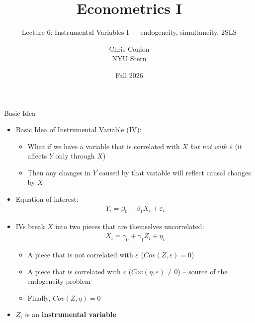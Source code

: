 \documentclass[aspectratio=169,11pt]{beamer}
\title[L8a - Instrumental Variables I]{ Econometrics I}
\subtitle{Lecture 6: Instrumental Variables I --- endogeneity, simultaneity, 2SLS}
\author{Chris Conlon \\NYU Stern}
\date{Fall 2026}
\begin{document}
\maketitle

\begin{frame}{Basic Idea}
\begin{itemize}
	\item Basic Idea of Instrumental Variable (IV):
		\begin{itemize}
			\item What if we have a variable that is correlated with $X$ \emph{but not with $\varepsilon$} (it affects $Y$ only through $X$)
			\item Then any changes in $Y$ caused by that variable will reflect causal changes by $X$
		\end{itemize}
\medskip
\item Equation of interest:
\begin{align*}
	Y_i = \beta_0 + \beta_1 X_i + \varepsilon_i
\end{align*}
	\item IVs break $X$ into two pieces that are themselves uncorrelated:
		\begin{align*}
			X_i =\gamma_0 + \gamma_1  Z_i + \eta_i
		\end{align*}

		\begin{itemize}
			\item A piece that is not correlated with $\varepsilon$ ($Cov(Z,\varepsilon)=0$)
			\item A piece that is correlated with $\varepsilon$ ($Cov(\eta,\varepsilon)\ne0$) -- source of the endogeneity problem
			\item Finally, $Cov(Z,\eta)=0$
		\end{itemize}
	\item $Z_i$ is an {\bf instrumental variable}
\end{itemize}
\end{frame}
\end{document}
